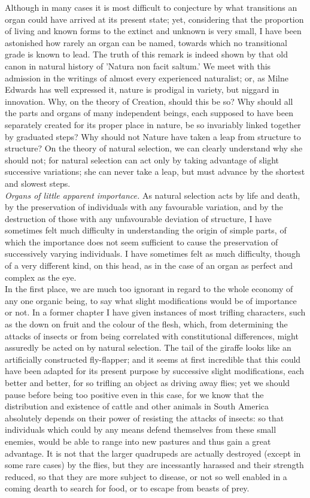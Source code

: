 \indent Although in many cases it is most difficult to conjecture by what transitions an organ could have arrived at its present state; yet, considering that the proportion of living and known forms to the extinct and unknown is very small, I have been astonished how rarely an organ can be named, towards which no transitional grade is known to lead. The truth of this remark is indeed shown by that old canon in natural history of 'Natura non facit saltum.' We meet with this admission in the writings of almost every experienced naturalist; or, as Milne Edwards has well expressed it, nature is prodigal in variety, but niggard in innovation. Why, on the theory of Creation, should this be so? Why should all the parts and organs of many independent beings, each supposed to have been separately created for its proper place in nature, be so invariably linked together by graduated steps? Why should not Nature have taken a leap from structure to structure? On the theory of natural selection, we can clearly understand why she should not; for natural selection can act only by taking advantage of slight successive variations; she can never take a leap, but must advance by the shortest and slowest steps.\\
\indent \emph{Organs of little apparent importance.} As natural selection acts by life and death, by the preservation of individuals with any favourable variation, and by the destruction of those with any unfavourable deviation of structure, I have sometimes felt much difficulty in understanding the origin of simple parts, of which the importance does not seem sufficient to cause the preservation of successively varying individuals. I have sometimes felt as much difficulty, though of a very different kind, on this head, as in the case of an organ as perfect and complex as the eye.\\
\indent In the first place, we are much too ignorant in regard to the whole economy of any one organic being, to say what slight modifications would be of importance or not. In a former chapter I have given instances of most trifling characters, such as the down on fruit and the colour of the flesh, which, from determining the attacks of insects or from being correlated with constitutional differences, might assuredly be acted on by natural selection. The tail of the giraffe looks like an artificially constructed fly-flapper; and it seems at first incredible that this could have been adapted for its present purpose by successive slight modifications, each better and better, for so trifling an object as driving away flies; yet we should pause before being too positive even in this case, for we know that the distribution and existence of cattle and other animals in South America absolutely depends on their power of resisting the attacks of insects: so that individuals which could by any means defend themselves from these small enemies, would be able to range into new pastures and thus gain a great advantage. It is not that the larger quadrupeds are actually destroyed (except in some rare cases) by the flies, but they are incessantly harassed and their strength reduced, so that they are more subject to disease, or not so well enabled in a coming dearth to search for food, or to escape from beasts of prey.\\
